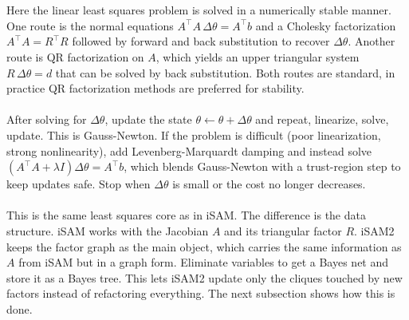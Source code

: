 \\ \\
Here the linear least squares problem is solved in a numerically stable manner. One route is the normal equations $A^\top A\,\Delta\theta = A^\top b$ and a Cholesky factorization $A^\top A = R^\top R$ followed by forward and back substitution to recover $\Delta\theta$. Another route is QR factorization on $A$, which yields an upper triangular system $R\,\Delta\theta = d$ that can be solved by back substitution. Both routes are standard, in practice QR factorization methods are preferred for stability.
\\ \\
After solving for $\Delta\theta$, update the state $\theta \leftarrow \theta + \Delta\theta$ and repeat, linearize, solve, update. This is Gauss-Newton. If the problem is difficult (poor linearization, strong nonlinearity), add Levenberg-Marquardt damping and instead solve $(A^\top A + \lambda I)\Delta\theta = A^\top b$, which blends Gauss-Newton with a trust-region step to keep updates safe. Stop when $\Delta\theta$ is small or the cost no longer decreases.
\\ \\
This is the same least squares core as in iSAM. The difference is the data structure. iSAM works with the Jacobian $A$ and its triangular factor $R$. iSAM2 keeps the factor graph as the main object, which carries the same information as $A$ from iSAM but in a graph form. Eliminate variables to get a Bayes net and store it as a Bayes tree. This lets iSAM2 update only the cliques touched by new factors instead of refactoring everything. The next subsection shows how this is done.



